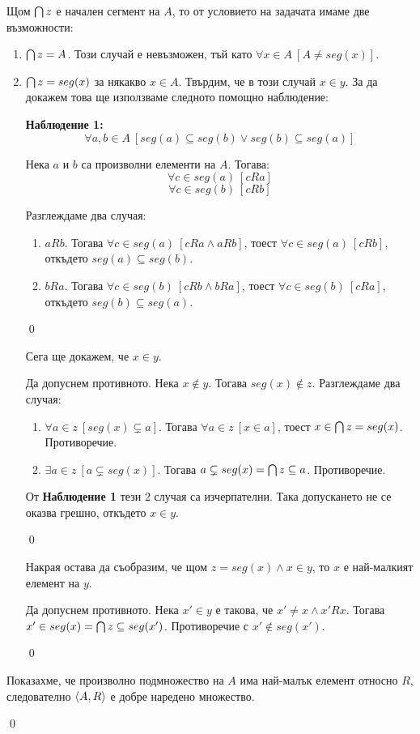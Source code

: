 \quad
Щом $\bigcap z$ е начален сегмент на $A$, то от условието на задачата имаме две възможности:
\begin{enumerate}[label={\arabic* сл.}]
\item
$\bigcap z = A$.
Този случай е невъзможен, тъй като $\forall x \in A\ [A \neq seg(x)]$.
\item
$\bigcap z = seg(x)$ за някакво $x \in A$.
Твърдим, че в този случай $x \in y$.
За да докажем това ще използваме следното помощно наблюдение:

\quad
\textbf{Наблюдение 1:}
\[
\forall a, b \in A\ [ seg(a) \subseteq seg(b) \lor seg(b) \subseteq seg(a)]
\]
\begin{tcolorbox}[mybox={Доказателство:}]
\quad
Нека $a$ и $b$ са произволни елементи на $A$.
Тогава:
\[
\forall c \in seg(a) \ [cRa]
\]
\[
\forall c \in seg(b) \ [cRb]
\]

\quad
Разглеждаме два случая:
\begin{enumerate}[label={\arabic* сл.}]
\item
$aRb$.
Тогава $\forall c \in seg(a) \ [cRa \land aRb]$, тоест $\forall c \in seg(a) \ [cRb]$, откъдето $seg(a) \subseteq seg(b)$.

\item
$bRa$.
Тогава $\forall c \in seg(b) \ [cRb \land bRa]$, тоест $\forall c \in seg(b) \ [cRa]$, откъдето $seg(b) \subseteq seg(a)$.

\end{enumerate}
\qed
\end{tcolorbox}

\quad
Сега ще докажем, че $x \in y$.
\begin{tcolorbox}[mybox={Доказателство:}]
\quad
Да допуснем противното.
Нека $x \notin y$.
Тогава $seg(x) \notin z$.
Разглеждаме два случая:
\begin{enumerate}[label={\arabic* сл.}]
\item
$\forall a \in z\ [seg(x) \subsetneq a]$.
Тогава $\forall a \in z\ [x \in a]$, тоест $x \in \bigcap z = seg(x)$. Противоречие.
\item
$\exists a \in z\ [a \subsetneq seg(x) ]$.
Тогава $a \subsetneq seg(x) = \bigcap z \subseteq a$. Противоречие.
\end{enumerate}

\quad
От \textbf{Наблюдение 1} тези 2 случая са изчерпателни.
Така допускането не се оказва грешно, откъдето $x \in y$.

\qed
\end{tcolorbox}

\quad
Накрая остава да съобразим, че щом $z = seg(x) \land x \in y$, то $x$ е най-малкият елемент на $y$.

\begin{tcolorbox}[mybox={Доказателство:}]
\quad
Да допуснем противното.
Нека $x' \in y$ е такова, че $x' \neq x \land x'Rx$.
Тогава $x' \in seg(x) = \bigcap z \subseteq seg(x')$.
Противоречие с $x' \notin seg(x')$.

\qed
\end{tcolorbox}
\end{enumerate}

\quad
Показахме, че произволно подмножество на $A$ има най-малък елемент относно $R$,
следователно $\langle A, R \rangle$ е добре наредено множество.

\qed

